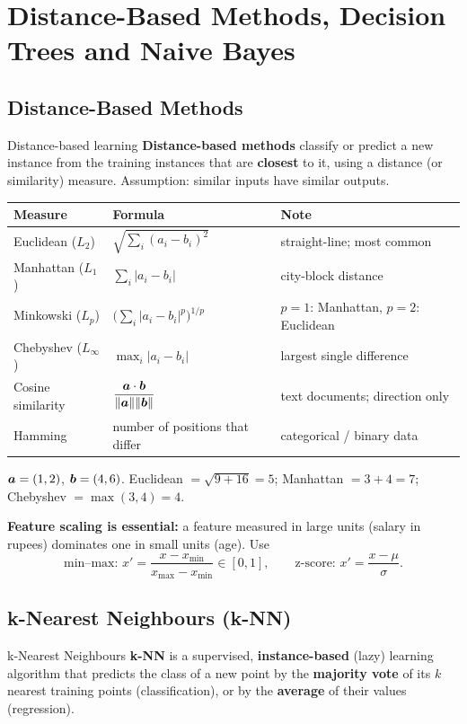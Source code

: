 \chapter{Distance-Based Methods, Decision Trees and Naive Bayes}\label{n:knn}

\section{Distance-Based Methods}
\begin{dfn}{Distance-based learning}
\textbf{Distance-based methods} classify or predict a new instance from the training instances that are \textbf{closest} to it, using a distance (or similarity) measure. Assumption: similar inputs have similar outputs.
\end{dfn}

\begin{center}
\small
\begin{tabular}{@{}lll@{}}
\toprule
\textbf{Measure} & \textbf{Formula} & \textbf{Note}\\
\midrule
Euclidean ($L_2$) & $\sqrt{\sum_i(a_i-b_i)^2}$ & straight-line; most common\\
Manhattan ($L_1$) & $\sum_i|a_i-b_i|$ & city-block distance\\
Minkowski ($L_p$) & $\big(\sum_i|a_i-b_i|^p\big)^{1/p}$ & $p=1$: Manhattan, $p=2$: Euclidean\\
Chebyshev ($L_\infty$) & $\max_i|a_i-b_i|$ & largest single difference\\
Cosine similarity & $\dfrac{\boldsymbol{a}\cdot\boldsymbol{b}}{\|\boldsymbol{a}\|\|\boldsymbol{b}\|}$ & text documents; direction only\\
Hamming & number of positions that differ & categorical / binary data\\
\bottomrule
\end{tabular}
\end{center}

\begin{numer}[: distances]
$\boldsymbol{a}=(1,2)$, $\boldsymbol{b}=(4,6)$. Euclidean $=\sqrt{9+16}=5$; Manhattan $=3+4=7$; Chebyshev $=\max(3,4)=4$.
\end{numer}

\textbf{Feature scaling is essential:} a feature measured in large units (salary in rupees) dominates one in small units (age). Use
\[
\text{min--max: } x'=\frac{x-x_{\min}}{x_{\max}-x_{\min}}\in[0,1],\qquad \text{z-score: } x'=\frac{x-\mu}{\sigma}.
\]

\section{k-Nearest Neighbours (k-NN)}
\begin{dfn}{k-Nearest Neighbours}
\textbf{k-NN} is a supervised, \textbf{instance-based} (lazy) learning algorithm that predicts the class of a new point by the \textbf{majority vote} of its $k$ nearest training points (classification), or by the \textbf{average} of their values (regression).
\end{dfn}

